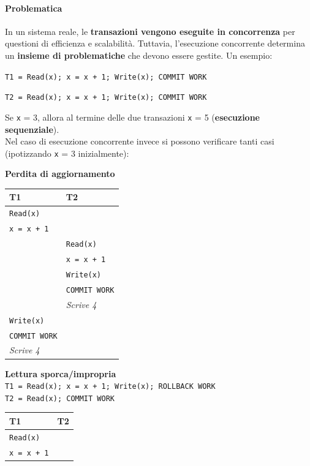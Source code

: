 \documentclass[10pt]{book}
\begin{document}
\paragraph{Problematica} In un sistema reale, le \textbf{transazioni vengono eseguite in concorrenza} per questioni di efficienza e scalabilità. Tuttavia, l'esecuzione concorrente determina un \textbf{insieme di problematiche} che devono essere gestite. Un esempio:
\begin{list}{}{}
	\item \texttt{T1 = Read(x); x = x + 1; Write(x); COMMIT WORK}
	\item \texttt{T2 = Read(x); x = x + 1; Write(x); COMMIT WORK}
	\item Se \texttt{x} = 3, allora al termine delle due transazioni \texttt{x} = 5 (\textbf{esecuzione sequenziale}).\\
	Nel caso di esecuzione concorrente invece si possono verificare tanti casi (ipotizzando \texttt{x} = 3 inizialmente):
	\begin{list}{}{}
		\item \textbf{Perdita di aggiornamento}
		\begin{center}
			\begin{tabular}{l | l}
				T1 & T2\\
				\hline
				\texttt{Read(x)} & \\
				\texttt{x = x + 1} & \\
				& \texttt{Read(x)}\\
				& \texttt{x = x + 1}\\
				& \texttt{Write(x)}\\
				& \texttt{COMMIT WORK}\\
				& \textit{Scrive 4} \\
				\texttt{Write(x)} & \\
				\texttt{COMMIT WORK} & \\
				\textit{Scrive 4} &
			\end{tabular}
		\end{center}
		\item \textbf{Lettura sporca/impropria}\\
		\texttt{T1 = Read(x); x = x + 1; Write(x); ROLLBACK WORK}\\
		\texttt{T2 = Read(x); COMMIT WORK}
		\begin{center}
			\begin{tabular}{l | l}
				T1 & T2\\
				\hline
				\texttt{Read(x)} & \\
				\texttt{x = x + 1} & \\

\end{tabular}
\end{center}
\end{list}
\end{list}
\end{document}
